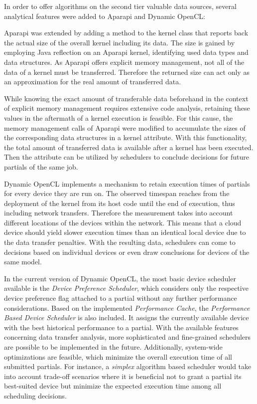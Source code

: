 In order to offer algorithms on the second tier valuable data sources, several analytical features were added to Aparapi and Dynamic OpenCL:
\begin{description}[style=nextline]
	\item[Kernel Data Size]
	Aparapi was extended by adding a method to the kernel class that reports back the actual size of the overall kernel including its data. The size is gained by employing Java reflection on an Aparapi kernel, identifying used data types and data structures. As Aparapi offers explicit memory management, not all of the data of a kernel must be transferred. Therefore the returned size can act only as an approximation for the real amount of transferred data.
	\item[Historical Data Transfer]
	While knowing the exact amount of transferable data beforehand in the context of explicit memory management requires extensive code analysis, retaining these values in the aftermath of a kernel execution is feasible. For this cause, the memory management calls of Aparapi were modified to accumulate the sizes of the corresponding data structures in a kernel attribute. With this functionality, the total amount of transferred data is available after a kernel has been executed. Then the attribute can be utilized by schedulers to conclude decisions for future partials of the same job.
	\item[Performance Cache]
	Dynamic OpenCL implements a mechanism to retain execution times of partials for every device they are run on. The observed timespan reaches from the deployment of the kernel from its host code until the end of execution, thus including network transfers. Therefore the measurement takes into account different locations of the devices within the network. This means that a cloud device should yield slower execution times than an identical local device due to the data transfer penalties. With the resulting data, schedulers can come to decisions based on individual devices or even draw conclusions for devices of the same model.
\end{description}

In the current version of Dynamic OpenCL, the most basic device scheduler available is the \textit{Device Preference Scheduler}, which considers only the respective device preference flag attached to a partial without any further performance considerations.
Based on the implemented \textit{Performance Cache}, the \textit{Performance Based Device Scheduler} is also included. It assigns the currently available device with the best historical performance to a partial. With the available features concerning data transfer analysis, more sophisticated and fine-grained schedulers are possible to be implemented in the future. Additionally, system-wide optimizations are feasible, which minimize the overall execution time of all submitted partials. For instance, a \textit{simplex} algorithm based scheduler would take into account trade-off scenarios where it is beneficial not to grant a partial its best-suited device but minimize the expected execution time among all scheduling decisions.

